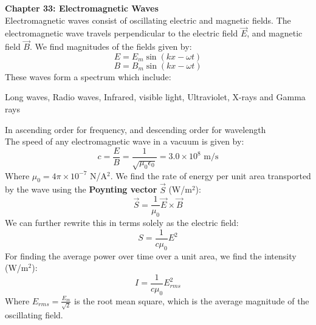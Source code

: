 \documentclass[11pt]{article}
\begin{document}
    \noindent \textbf{Chapter 33: Electromagnetic Waves } \\%

    \noindent Electromagnetic waves consist of oscillating electric and magnetic fields.
    The electromagnetic wave travels perpendicular to the electric field $\vec{E} $, and magnetic field $\vec{B} $.
    We find magnitudes of the fields given by:
    \begin{equation}
        E = E_m \sin (kx - \omega t) \tag{electric field}
    \end{equation}
    \begin{equation}
        B = B_m \sin(kx - \omega t) \tag{magnetic field}
    \end{equation}
    \noindent These waves form a spectrum which include:
    \begin{center}
        Long waves, Radio waves, Infrared, visible light, Ultraviolet, X-rays and Gamma rays
    \end{center}
   In ascending order for frequency, and descending order for wavelength
    \\The speed of any electromagnetic wave in a vacuum is given by:
    \begin{equation}
        c = \frac{E}{B} = \frac{1}{\sqrt{\mu_0 \epsilon_0}} = 3.0 \times 10^8 \text{ m/s} \tag{speed of light}
    \end{equation}
    Where $\mu_0 = 4\pi \times 10^{-7}$ N/A$^2$.
    We find the rate of energy per unit area transported by the wave using the \textbf{Poynting vector } $\vec{S}$ (W/m$^2$):
    \begin{equation}
        \vec{S} = \frac{1}{\mu_0} \vec{E} \times \vec{B} \tag{Poynting vector}
    \end{equation}
    We can further rewrite this in terms solely as the electric field:
    \begin{equation}
       S = \frac{1}{c \mu_0} E^2 \tag{instant energy flow rate}
        \end{equation}
    For finding the average power over time over a unit area, we find the intensity (W/m$^2$):
    \begin{equation}
        I = \frac{1}{c \mu_0} E_{rms}^2 \tag{intensity}
    \end{equation}
    Where $E_{rms} = \frac{E_m}{\sqrt{2}}$ is the root mean square,
    which is the average magnitude of the oscillating field.
\end{document}
